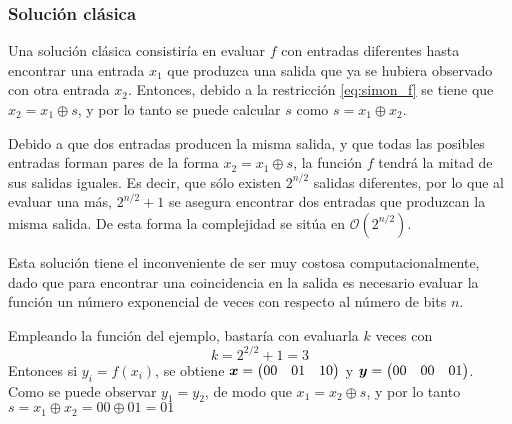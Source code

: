 \subsubsection{Solución clásica}

Una solución clásica consistiría en evaluar $f$ con entradas diferentes hasta 
encontrar una entrada $x_1$ que produzca una salida que ya se hubiera observado 
con otra entrada $x_2$. Entonces, debido a la restricción \ref{eq:simon_f} se 
tiene que $x_2 = x_1 \oplus s$, y por lo tanto se puede calcular $s$ como $s = 
x_1 \oplus x_2$.

Debido a que dos entradas producen la misma salida, y que todas las posibles 
entradas forman pares de la forma $x_2 = x_1 \oplus s$, la función $f$ tendrá la 
mitad de sus salidas iguales. Es decir, que sólo existen $2^{n/2}$ salidas 
diferentes, por lo que al evaluar una más, $2^{n/2} + 1$ se asegura encontrar 
dos entradas que produzcan la misma salida. De esta forma la complejidad se 
sitúa en $\mathcal{O}(2^{n/2})$.

Esta solución tiene el inconveniente de ser muy costosa computacionalmente, dado 
que para encontrar una coincidencia en la salida es necesario evaluar la función 
un número exponencial de veces con respecto al número de bits $n$.

Empleando la función del ejemplo, bastaría con evaluarla $k$ veces con
$$k = 2^{2/2}+1 = 3$$
Entonces si $y_i = f(x_i)$, se obtiene $\boldsymbol{x} = \begin{pmatrix} 00 & 01 & 10 \end{pmatrix}$ y $ \boldsymbol{y} = 
\begin{pmatrix} 00 &00 & 01 \end{pmatrix}$.  Como se puede observar $y_1 = y_2$, de modo que $x_1 = x_2 
\oplus s$, y por lo tanto $s = x_1 \oplus x_2 = 00 \oplus 01 = 01$

